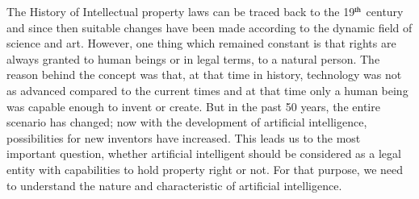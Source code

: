 \begin{multicols}{2}

\noi
The History of Intellectual property laws can be traced back to the 19$^{\rm th}$ century and since
then suitable changes have been made according to the dynamic field of science and art.
However, one thing which remained constant is that rights are always granted to human
beings or in legal terms, to a natural person. The reason behind the concept was that, at that
time in history, technology was not as advanced compared to the current times and at that
time only a human being was capable enough to invent or create. But in the past 50 years,
the entire scenario has changed; now with the development of artificial intelligence,
possibilities for new inventors have increased. This leads us to the most important question,
whether artificial intelligent should be considered as a legal entity with capabilities to hold
property right or not. For that purpose, we need to understand the nature and characteristic
of artificial intelligence. 


\end{multicols}
